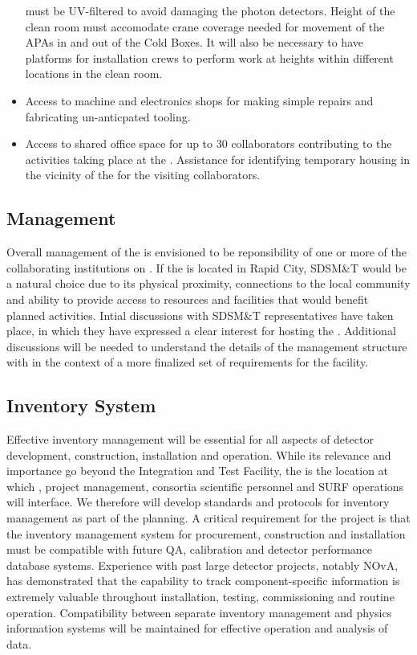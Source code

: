 \begin{itemize}
    must be UV-filtered to avoid damaging the photon detectors.
    Height of the clean room must accomodate crane coverage needed for
    movement of the APAs in and out of the Cold Boxes.  It will also
    be necessary to have platforms for installation crews to perform
    work at heights within different locations in the clean room.
  \item Access to machine and electronics shops for making simple
    repairs and fabricating un-anticpated tooling.
  \item Access to shared office space for up to 30 collaborators
    contributing to the activities taking place at the .
    Assistance for identifying temporary housing in the vicinity of
    the  for the visiting collaborators.
\end{itemize}

\subsection{Management}

Overall management of the  is envisioned to be
reponsibility of one or more of the collaborating institutions on
.  If the  is located in Rapid City, SDSM\&T
would be a natural choice due to its physical proximity, connections
to the local community and ability to provide access to resources and
facilities that would benefit planned  activities.  Intial
discussions with SDSM\&T representatives have taken place, in which
they have expressed a clear interest for hosting the .
Additional discussions will be needed to understand the details of the
 management structure with in the context of a more
finalized set of requirements for the facility.

\subsection{Inventory System}

Effective inventory management will be essential for all aspects of
 detector development, construction, installation and
operation.  While its relevance and importance go beyond the
Integration and Test Facility, the  is the location at
which ,  project management, consortia
scientific personnel and SURF operations will interface.  We therefore
will develop standards and protocols for inventory management as part
of the  planning.  A critical requirement for the project
is that the inventory management system for procurement, construction
and installation must be compatible with future QA, calibration and
detector performance database systems.  Experience with past large
detector projects, notably NOvA, has demonstrated that the capability
to track component-specific information is extremely valuable
throughout installation, testing, commissioning and routine operation.
Compatibility between separate inventory management and physics
information systems will be maintained for effective operation and
analysis of  data.


